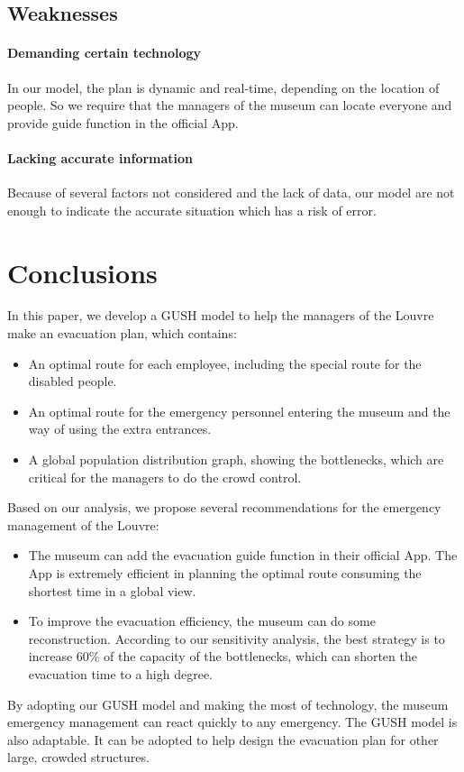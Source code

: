 \documentclass[a4paper,12pt]{article}
\begin{document}
\subsection{Weaknesses}
\paragraph{Demanding certain technology} In our model, the plan is dynamic and real-time, depending on the location of people. So we require that the managers of the museum can locate everyone and provide guide function in the official App.
\paragraph{Lacking accurate information} Because of several factors not considered and the lack of data, our model are not enough to indicate the accurate situation which has a risk of error.
\section{Conclusions}
In this paper, we develop a GUSH model to help the managers of the Louvre make an evacuation plan, which contains:
\begin{itemize}
\item An optimal route for each employee, including the special route for the disabled people. 
\item An optimal route for the emergency personnel entering the museum and the way of using the extra entrances.
\item A global population distribution graph, showing the bottlenecks, which are critical for the managers to do the crowd control.
\end{itemize}

Based on our analysis, we propose several recommendations for the emergency management of the Louvre:
\begin{itemize}
\item The museum can add the evacuation guide function in their official App. The App is extremely efficient in planning the optimal route consuming the shortest time in a global view.
\item To improve the evacuation efficiency, the museum can do some reconstruction. According to our sensitivity analysis, the best strategy is to increase 60\% of the capacity of the bottlenecks, which can shorten the evacuation time to a high degree. 
\end{itemize}

By adopting our GUSH model and making the most of technology, the museum emergency management can react quickly to any emergency. The GUSH model is also adaptable. It can be adopted to help design the evacuation plan for other large, crowded structures.


\end{document}
